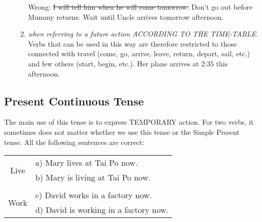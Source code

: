 \begin{enumerate}
\begin{enumerate}
                \newline
                Wrong: \st{I will tell him when he will come tomorrow.}
                \newline
                \newline
                Don't go out before Mummy returns.
                \newline
                \newline
                Wait until Uncle arrives tomorrow afternoon.
            \item {\it when referring to a future action ACCORDING TO THE 
                TIME-TABLE.}
                \newline
                \newline
                Verbs that can be used in this way are therefore restricted to
                those connected with travel (come, go, arrive, leave, return,
                depart, sail, etc.) and few others (start, begin, etc.).
                \newline
                \newline
                Her plane arrives at 2:35 this afternoon.
        \end{enumerate}
\end{enumerate}

\newpage
\subsection{Present Continuous Tense}
The main use of this tense is to express TEMPORARY action.
For two verbs, it sometimes does not matter whether we use this tense or the
Simple Present tense.
All the following sentences are correct:
\begin{center}
\begin{tabular}{|cl|}
    \hline
    \multirow{2}{*}{Live} & a) Mary lives at Tai Po now. \\
                          & b) Mary is living at Tai Po now. \\ 
                          & \\
    \multirow{2}{*}{Work} & c) David works in a factory now. \\
                          & d) David is working in a factory now. \\ \hline
\end{tabular}
\end{center}

